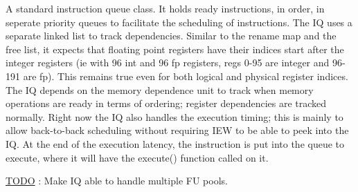 A standard instruction queue class. It holds ready instructions, in order, in seperate priority queues to facilitate the scheduling of instructions. The IQ uses a separate linked list to track dependencies. Similar to the rename map and the free list, it expects that floating point registers have their indices start after the integer registers (ie with 96 int and 96 fp registers, regs 0-\/95 are integer and 96-\/191 are fp). This remains true even for both logical and physical register indices. The IQ depends on the memory dependence unit to track when memory operations are ready in terms of ordering; register dependencies are tracked normally. Right now the IQ also handles the execution timing; this is mainly to allow back-\/to-\/back scheduling without requiring IEW to be able to peek into the IQ. At the end of the execution latency, the instruction is put into the queue to execute, where it will have the execute() function called on it. \begin{Desc}
\item[\hyperlink{todo__todo000030}{TODO}]: Make IQ able to handle multiple FU pools. \end{Desc}



